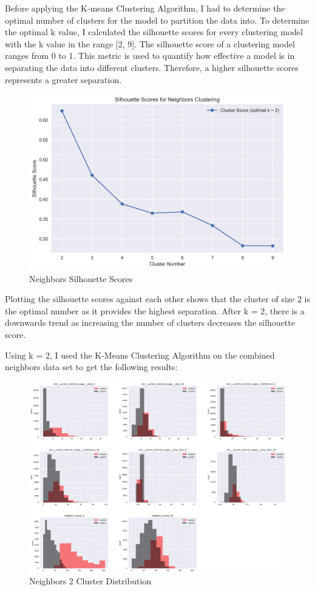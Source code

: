 \documentclass{article}
\begin{document}
\noindent
Before applying the K-means Clustering Algorithm, I had to determine the optimal number of clusters for the model to partition the data into. To determine the optimal k value, I calculated the silhouette scores for every clustering model with the k value in the range [2, 9]. The silhouette score of a clustering model ranges from 0 to 1. This metric is used to quantify how effective a model is in separating the data into different clusters. Therefore, a higher silhouette scores represents a greater separation. 

\begin{figure}[htp]
    \centering
    \includegraphics[width=12cm]{visuals/silhouette_scores_neighbors.png}
    \caption{Neighbors Silhouette Scores}
\end{figure}

\noindent
Plotting the silhouette scores against each other shows that the cluster of size 2 is the optimal number as it provides the highest separation. After k = 2, there is a downwards trend as increasing the number of clusters decreases the silhouette score.

\newpage
\noindent
Using k = 2, I used the K-Means Clustering Algorithm on the combined neighbors data set to get the following results:

\begin{figure}[htp]
    \centering
    \includegraphics[width=14cm]{visuals/neighbors (2 clusters).png}
    \caption{Neighbors 2 Cluster Distribution}
\end{figure}
\end{document}
